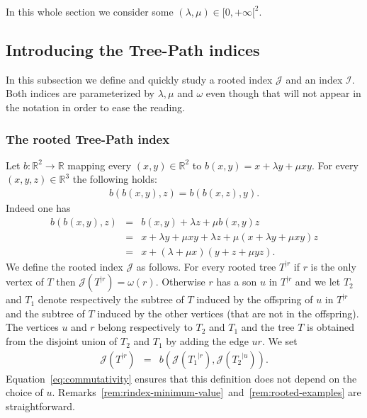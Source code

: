 \documentclass[11 pt]{modarticle}
\newcommand{\cR}{\mathbb{R}}
\newcommand{\wmap}{\omega}
\newcommand{\rtree}[2]{{#1}^{\lvert #2}}
\newcommand{\bilinear}{b}
\newcommand{\indexsymbol}{\mathcal{I}}
\newcommand{\rindexsymbol}{\mathcal{J}}
\newcommand{\rindex}[2]{\rindexsymbol(\rtree{#2}{#1})}
\begin{document}
In this whole section we consider some $(\lambda, \mu) \in [0,+\infty[^2$.


\subsection{Introducing the Tree-Path indices}

In this subsection we define and quickly study a rooted index $\rindexsymbol$ and an index $\indexsymbol$. Both indices are parameterized by $\lambda, \mu$ and $\wmap$ even though that will not appear in the notation in order to ease the reading.

\subsubsection{The rooted Tree-Path index}

Let $\bilinear : \cR^2 \to \cR$ mapping every $(x,y) \in \cR^2$ to $\bilinear(x,y) = x + \lambda y + \mu x y$. For every $(x,y,z) \in \cR^3$ the following holds:
\begin{eqnarray}
	\bilinear(\bilinear(x,y),z) = \bilinear(\bilinear(x,z),y). \label{eq:commutativity}
\end{eqnarray}
Indeed one has
\begin{eqnarray*}
	\bilinear(\bilinear(x,y),z) & = & \bilinear(x,y) + \lambda z + \mu \bilinear(x,y) z \\
	& = & x + \lambda y + \mu x y + \lambda z + \mu (x + \lambda y + \mu x y) z \\
	& = & x + (\lambda + \mu x) (y+z + \mu y z).
\end{eqnarray*}
We define the rooted index $\rindexsymbol$ as follows. For every rooted tree $\rtree{T}{r}$ if $r$ is the only vertex of $T$ then $\rindex{r}{T} = \wmap(r)$. Otherwise $r$ has a son $u$ in $\rtree{T}{r}$ and we let $T_2$ and $T_1$ denote respectively the subtree of $T$ induced by the offspring of $u$ in $\rtree{T}{r}$ and the subtree of $T$ induced by the other vertices (that are not in the offspring). The vertices $u$ and $r$ belong respectively to $T_2$ and $T_1$ and the tree $T$ is obtained from the disjoint union of $T_2$ and $T_1$ by adding the edge $ur$. We set
\begin{eqnarray}
	\rindex{r}{T} & = & \bilinear(\rindex{r}{T_1}, \rindex{u}{T_2}). \label{eq:rindex-tree-decomp}
\end{eqnarray}
Equation~\eqref{eq:commutativity} ensures that this definition does not depend on the choice of $u$. Remarks~\ref{rem:rindex-minimum-value}~and~\ref{rem:rooted-examples} are straightforward.
\end{document}

